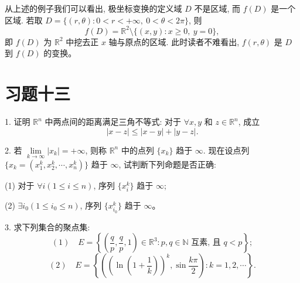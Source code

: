 \documentclass[UTF8, 12pt, fontset=fandol, oneside]{ctexart}
\begin{document}
从上述的例子我们可以看出, 极坐标变换的定义域 $D$ 不是区域, 而 $f(D)$ 是一个区域. 若取 $D=\{(r,\theta):0<r<+\infty,\ 0<\theta<2\pi\}$, 则
\[
  f(D)=\mathbb R^2\setminus\{(x,y):x\geqslant0,\ y=0\},
\]
即 $f(D)$ 为 $\mathbb R^2$ 中挖去正 $x$ 轴与原点的区域. 此时读者不难看出, $f(r,\theta)$ 是 $D$ 到 $f(D)$ 的变换。

\section*{习题十三}

1. 证明 $\mathbb R^n$ 中两点间的距离满足三角不等式: 对于 $\forall x,y$ 和 $z\in\mathbb R^n$, 成立
\[
  |x-z|\leqslant |x-y|+|y-z|.
\]

2. 若 $\lim\limits_{k\to\infty}|x_k|=+\infty$, 则称 $\mathbb R^n$ 中的点列 $\{x_k\}$ 趋于 $\infty$. 现在设点列 $\{x_k=(x_1^k,x_2^k,\cdots,x_n^k)\}$ 趋于 $\infty$, 试判断下列命题是否正确:

(1) 对于 $\forall i(1\leqslant i\leqslant n)$, 序列 $\{x_i^k\}$ 趋于 $\infty$;

(2) $\exists i_0(1\leqslant i_0\leqslant n)$, 序列 $\{x_{i_0}^k\}$ 趋于 $\infty$。

3. 求下列集合的聚点集:
\[
  (1)\quad E=\left\{\left(\frac qp,\frac qp,1\right)\in\mathbb R^3:p,q\in\mathbb N\text{ 互素, 且 }q<p\right\};
\]
\[
  (2)\quad E=\left\{\left(\left(\ln\left(1+\frac1k\right)\right)^k,\sin\frac{k\pi}{2}\right):k=1,2,\cdots\right\}.
\]
\end{document}
